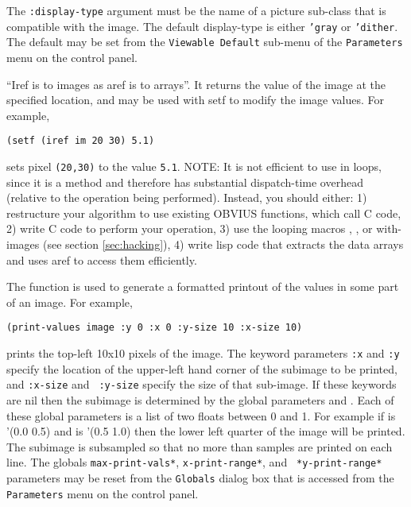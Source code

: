 The {\tt :display-type} argument must be the name of a picture
sub-class that is compatible with the image.  The default display-type
is either {\tt 'gray} or {\tt 'dither}.  The default may be set from
the {\tt Viewable Default} sub-menu of the {\tt Parameters} menu on
the control panel.


``Iref is to images as aref is to arrays''.  It returns the value of the
image at the specified location, and may be used with setf to modify the
image values.  For example,
\begin{verbatim}
(setf (iref im 20 30) 5.1)
\end{verbatim}
sets pixel {\tt (20,30)} to the value {\tt 5.1}.  NOTE: It is not
efficient to use  in loops, since it is a method and
therefore has substantial dispatch-time overhead (relative to the
operation being performed).  Instead, you should either: 1)
restructure your algorithm to use existing OBVIUS functions, which
call C code, 2) write C code to perform your operation, 3) use the
looping macros ,
, or with-images (see section
\ref{sec:hacking}), 4) write lisp code that extracts the data arrays
and uses aref to access them efficiently. 


The  function is used to generate a formatted printout
of the values in some part of an image.  For example,
\begin{verbatim}
(print-values image :y 0 :x 0 :y-size 10 :x-size 10)
\end{verbatim}
prints the top-left 10x10 pixels of the image.  The keyword 
parameters {\tt :x} and {\tt :y} specify the location of the upper-left
hand corner of the subimage to be printed, and {\tt :x-size} and {\tt
:y-size} specify the size of that sub-image.  If these keywords are
nil then the subimage is determined by the global parameters
 and .  Each of these global
parameters is a list of two floats between 0 and 1.  For example if
 is '(0.0 0.5) and  is
'(0.5 1.0) then the lower left quarter of the image will be printed.
The subimage is subsampled so that no more than
 samples are printed on each line.  The globals
{\tt *max-print-vals*}, {\tt *x-print-range*}, and {\tt
*y-print-range*} parameters may be reset from the {\tt Globals} dialog
box that is accessed from the {\tt Parameters} menu on the control
panel.

